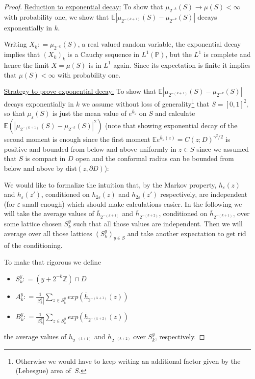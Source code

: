 \documentclass[11pt,reqno]{amsart}
\numberwithin{equation}{section}
\newcommand{\deq}{\mathrel{\mathop:}=}
\newcommand{\eps}{\varepsilon}
\begin{document}
\begin{proof}
	
	\underline{Reduction to exponential decay:} To show that $\mu_{2^{-k}}(S)\rightarrow\mu(S)<\infty$ with probability one, we show that $\mathbb E|\mu_{2^{-(k+1)}}(S)-\mu_{2^{-k}}(S)|$ decays exponentially in $k$.
	
	Writing $X_k\deq \mu_{2^{-k}}(S)$, a real valued random variable, the exponential decay implies that $(X_k)_k$ is a Cauchy sequence in $L^1(\mathbb P)$, but the $L^1$ is complete and hence the limit $X=\mu(S)$ is in $L^1$ again. Since its expectation is finite it implies that $\mu(S)<\infty$ with probability one.
	
	\underline{Strategy to prove exponential decay:} To show that $\mathbb E|\mu_{2^{-(k+1)}}(S)-\mu_{2^{-k}}(S)|$ decays exponentially in $k$ we assume without loss of generality\footnote{Otherwise we would have to keep writing an additional factor given by the (Lebesgue) area of~$S$.} that $S=[0,1]^2$, so that $\mu_\eps(S)$ is just the mean value of $e^{\overline h_\eps}$ on $S$ and calculate $\mathbb E(|\mu_{2^{-(k+1)}}(S)-\mu_{2^{-k}}(S)|^2)$ (note that showing exponential decay of the second moment is enough since the first moment $\mathbb Ee^{\overline h_\eps(z)}=C(z;D)^{\gamma^2/2}$ is positive and bounded from below and above uniformly in $z\in S$ since we assumed that $S$ is compact in $D$ open and the conformal radius can be bounded from below and above by $\text{dist}(z,\partial D)$):
	
	We would like to formalize the intuition that, by the Markov property, $h_\eps(z)$ and $h_\eps(z')$, conditioned on $h_{2\eps}(z)$ and $h_{2\eps}(z')$ respectively, are independent (for $\eps$ small enough) which should make calculations easier. In the following we will take the average values of $\overline h_{2^{-(k+1)}}$ and $\overline h_{2^{-(k+2)}}$, conditioned on $\overline h_{2^{-(k+1)}}$, over some lattice chosen $S_k^y$ such that all those values are independent. Then we will average over all those lattices $(S_k^y)_{y\in S}$ and take another expectation to get rid of the conditioning.
	
	To make that rigorous we define \begin{itemize}
		\item $S_k^y\deq (y+2^{-k}\mathbb Z)\cap D$
		\item $A_k^y\deq \frac{1}{|S_k^y|}\sum_{z\in S_k^y}exp(\overline h_{2^{-(k+1)}}(z))$
		\item $B_k^y\deq \frac{1}{|S_k^y|}\sum_{z\in S_k^y}exp(\overline h_{2^{-(k+2)}}(z))$
	\end{itemize}
	the average values of $h_{2^{-(k+1)}}$ and $h_{2^{-(k+2)}}$ over $S_k^y$, respectively.
	

\end{proof}
\end{document}

